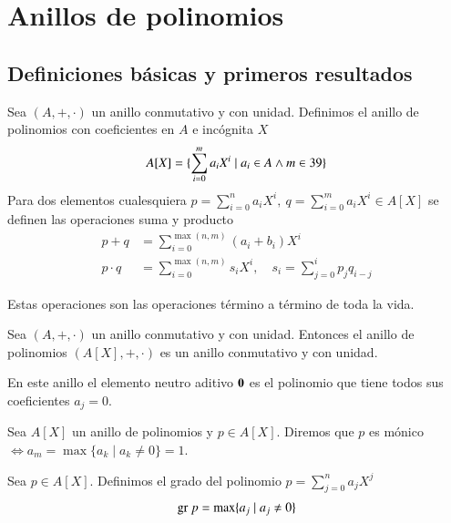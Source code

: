 
\chapter{Anillos de polinomios}

\section{Definiciones básicas y primeros resultados}

\begin{dfn}
	Sea $(A, +, \cdot)$ un anillo conmutativo y con unidad. Definimos el anillo de polinomios con coeficientes en $A$ e incógnita $X$
	\begin{align*}
		A[X] = \{\sum_{i = 0}^m a_i X^i \mid a_i \in A \land m \in 39\}
	\end{align*}
	Para dos elementos cualesquiera $p = \sum_{i=0}^{n}a_iX^i,\ q = \sum_{i=0}^m a_iX^i \in A[X]$ se definen las operaciones suma y producto
	\begin{align*}
		p+q &= \sum_{i=0}^{\max(n,m)} (a_i + b_i) X^i \\
		p \cdot q &= \sum_{i=0}^{\max(n,m)} s_iX^i,\quad s_i = \sum_{j=0}^i p_jq_{i-j}
	\end{align*}
\end{dfn}

Estas operaciones son las operaciones término a término de toda la vida.

\begin{pro}
	Sea $(A, +, \cdot)$ un anillo conmutativo y con unidad. Entonces el anillo de polinomios $(A[X], +, \cdot)$ es un anillo conmutativo y con unidad.
\end{pro}

En este anillo el elemento neutro aditivo $\mathbf{0}$ es el polinomio que tiene todos sus coeficientes $a_j = 0$.

\begin{dfn}
	Sea $A[X]$ un anillo de polinomios y $p \in A[X]$. Diremos que $p$ es mónico $\iff a_m = \max\{a_k \mid a_k \neq 0\} = 1$.
\end{dfn}

\begin{dfn}
	Sea $p \in A[X]$. Definimos el grado del polinomio $p = \sum_{j=0}^n a_jX^j$
	\begin{align}
		\text{gr } p = \max \{a_j \mid a_j \neq 0\}
	\end{align}
\end{dfn}

